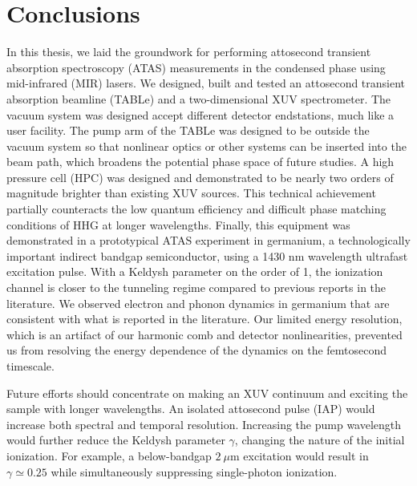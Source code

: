 \chapter{Conclusions}
\label{chap:conclusions}

In this thesis, we laid the groundwork for performing attosecond transient absorption spectroscopy (ATAS) measurements in the condensed phase using mid-infrared (MIR) lasers. We designed, built and tested an attosecond transient absorption beamline (TABLe) and a two-dimensional XUV spectrometer. The vacuum system was designed accept different detector endstations, much like a user facility. The pump arm of the TABLe was designed to be outside the vacuum system so that nonlinear optics or other systems can be inserted into the beam path, which broadens the potential phase space of future studies. A high pressure cell (HPC) was designed and demonstrated to be nearly two orders of magnitude brighter than existing XUV sources. This technical achievement partially counteracts the low quantum efficiency and difficult phase matching conditions of HHG at longer wavelengths. Finally, this equipment was demonstrated in a prototypical ATAS experiment in germanium, a technologically important indirect bandgap semiconductor, using a 1430 nm wavelength ultrafast excitation pulse. With a Keldysh parameter on the order of 1, the ionization channel is closer to the tunneling regime compared to previous reports in the literature. We observed electron and phonon dynamics in germanium that are consistent with what is reported in the literature. Our limited energy resolution, which is an artifact of our harmonic comb and detector nonlinearities, prevented us from resolving the energy dependence of the dynamics on the femtosecond timescale.

Future efforts should concentrate on making an XUV continuum and exciting the sample with longer wavelengths. An isolated attosecond pulse (IAP) would increase both spectral and temporal resolution. Increasing the pump wavelength would further reduce the Keldysh parameter $\gamma$, changing the nature of the initial ionization. For example, a below-bandgap $2 \ \mu \textrm{m}$ excitation would result in $\gamma\simeq 0.25$ while simultaneously suppressing single-photon ionization.